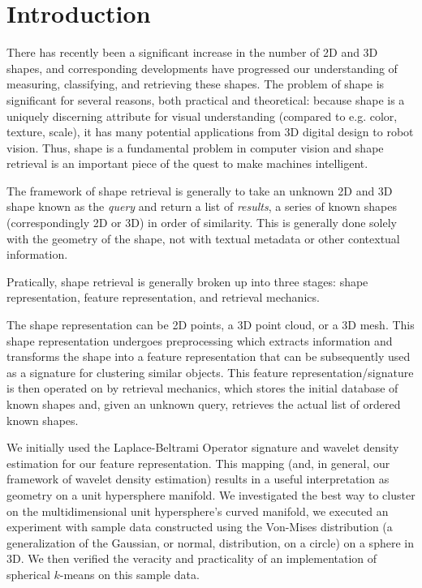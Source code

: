 \documentclass[../tech_report_1.tex]{subfiles}
\begin{document}
\section{Introduction}

There has recently been a significant increase in the number of 2D and 3D shapes, and corresponding developments have progressed our understanding of measuring, classifying, and retrieving these shapes. The problem of shape is significant for several reasons, both practical and theoretical: because shape is a uniquely discerning attribute for visual understanding (compared to e.g. color, texture, scale), it has many potential applications from 3D digital design to robot vision. Thus, shape is a fundamental problem in computer vision and shape retrieval is an important piece of the quest to make machines intelligent.

The framework of shape retrieval is generally to take an unknown 2D and 3D shape known as the \textit{query} and return a list of \textit{results}, a series of known shapes (correspondingly 2D or 3D) in order of similarity. This is generally done solely with the geometry of the shape, not with textual metadata or other contextual information.

Pratically, shape retrieval is generally broken up into three stages:
shape representation, feature representation, and retrieval mechanics.

The shape representation can be 2D points, a 3D point cloud, or a 3D mesh. This shape representation undergoes preprocessing which extracts information and transforms the shape into a feature representation that can be subsequently used as a signature for clustering similar objects. This feature representation/signature is then operated on by retrieval mechanics, which stores the initial database of known shapes and, given an unknown query, retrieves the actual list of ordered known shapes.

We initially used the Laplace-Beltrami Operator signature and wavelet density estimation for our feature representation. This mapping (and, in general, our framework of wavelet density estimation) results in a useful interpretation as geometry on a unit hypersphere manifold. We investigated the best way to cluster on the multidimensional unit hypersphere's curved manifold, we executed an experiment with sample data constructed using the Von-Mises distribution (a generalization of the Gaussian, or normal, distribution, on a circle) on a sphere in 3D. We then verified the veracity and practicality of an implementation of spherical $k$-means on this sample data.
\end{document}
